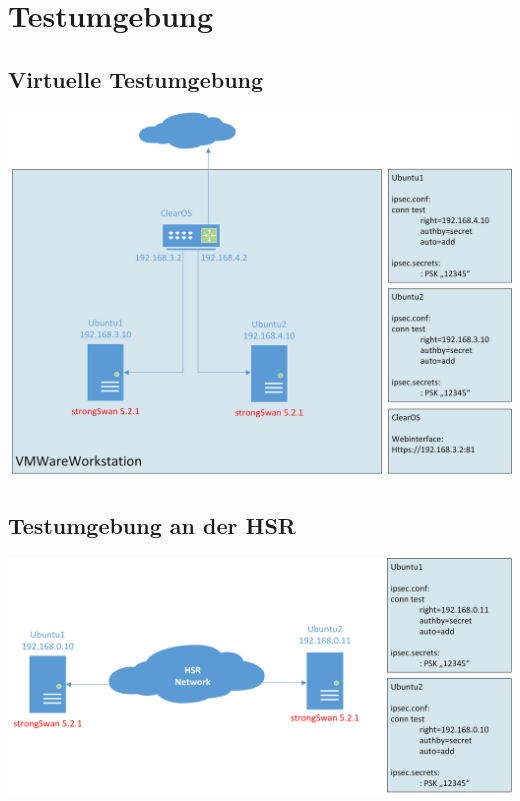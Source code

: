 \chapter{Testumgebung}

\section{Virtuelle Testumgebung}
\includegraphics[width=1\textwidth]{start/img/Testumgebung.png}


\section{Testumgebung an der HSR}
\includegraphics[width=1\textwidth]{start/img/TestumgebungReal.png}